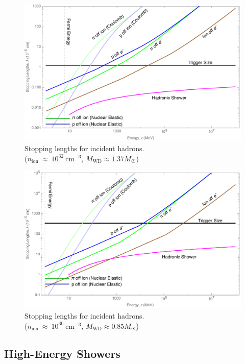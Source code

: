 \documentclass[twocolumn, preprintnumbers,amsmath,amssymb,prd, superscriptaddress]{revtex4}
\begin{document}
\begin{figure}
\includegraphics[scale=.3]{SPhighHad.pdf}
\caption{Stopping lengths for incident hadrons. \\ ($n_\text{ion}~\approx~10^{32}~\text{cm}^{-3}$, $M_\text{WD} \approx 1.37 M_{\astrosun}$)}
\label{fig:SPhighHad}
\end{figure}

\begin{figure}
\includegraphics[scale=.3]{SPlowHad.pdf}
\caption{Stopping lengths for incident hadrons. \\ ($n_\text{ion}~\approx~10^{30}~\text{cm}^{-3}$, $M_\text{WD} \approx 0.85 M_{\astrosun}$)}
\label{fig:SPlowHad}
\end{figure}

\subsection{High-Energy Showers}
\end{document}

